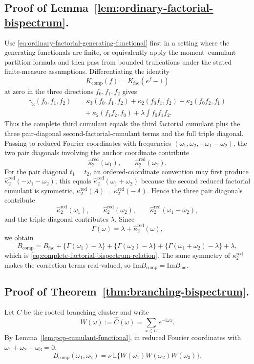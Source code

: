\documentclass[aap,press]{apt} \volno{00} \partno{00}
\newcommand{\E}{\mathbb{E}}
\renewcommand{\ii}{\mathrm{i}}
\newcommand{\1}{\mathbf{1}}
\newcommand{\Imm}{\mathrm{Im}}
\numberwithin{equation}{section}
\begin{document}
\subsection{Proof of Lemma~\ref{lem:ordinary-factorial-bispectrum}.}
Use \eqref{eq:ordinary-factorial-generating-functional} first in a setting where the generating functionals are finite, or equivalently apply the moment--cumulant partition formula and then pass from bounded truncations under the stated finite-measure assumptions. Differentiating the identity
\[
K_{\mathrm{comp}}(f)=K_{\mathrm{fac}}(e^f-1)
\]
at zero in the three directions $f_0,f_1,f_2$ gives
\begin{align*}
\gamma_3(f_0,f_1,f_2)
&=
\kappa_3(f_0,f_1,f_2)
+\kappa_2(f_0f_1,f_2)
+\kappa_2(f_0f_2,f_1) \\
&\quad+\kappa_2(f_1f_2,f_0)
+\lambda\int f_0f_1f_2 .
\end{align*}
Thus the complete third cumulant equals the third factorial cumulant plus the three pair-diagonal second-factorial-cumulant terms and the full triple diagonal. Passing to reduced Fourier coordinates with frequencies $(\omega_1,\omega_2,-\omega_1-\omega_2)$, the two pair diagonals involving the anchor coordinate contribute
\[
\widehat\kappa_2^{\mathrm{red}}(\omega_1),\qquad
\widehat\kappa_2^{\mathrm{red}}(\omega_2).
\]
For the pair diagonal $t_1=t_2$, an ordered-coordinate convention may first produce $\widehat\kappa_2^{\mathrm{red}}(-\omega_1-\omega_2)$; this equals $\widehat\kappa_2^{\mathrm{red}}(\omega_1+\omega_2)$ because the second reduced factorial cumulant is symmetric, $\kappa_2^{\mathrm{red}}(A)=\kappa_2^{\mathrm{red}}(-A)$. Hence the three pair diagonals contribute
\[
\widehat\kappa_2^{\mathrm{red}}(\omega_1),\qquad
\widehat\kappa_2^{\mathrm{red}}(\omega_2),\qquad
\widehat\kappa_2^{\mathrm{red}}(\omega_1+\omega_2),
\]
and the triple diagonal contributes $\lambda$. Since
\[
\Gamma(\omega)=\lambda+\widehat\kappa_2^{\mathrm{red}}(\omega),
\]
we obtain
\[
B_{\mathrm{comp}}
=
B_{\mathrm{fac}}
+\{\Gamma(\omega_1)-\lambda\}
+\{\Gamma(\omega_2)-\lambda\}
+\{\Gamma(\omega_1+\omega_2)-\lambda\}
+\lambda,
\]
which is \eqref{eq:complete-factorial-bispectrum-relation}. The same symmetry of $\kappa_2^{\mathrm{red}}$ makes the correction terms real-valued, so $\Imm B_{\mathrm{comp}}=\Imm B_{\mathrm{fac}}$.

\subsection{Proof of Theorem~\ref{thm:branching-bispectrum}.}
Let $C$ be the rooted branching cluster and write
\[
W(\omega):=\widehat C(\omega)=\sum_{x\in C}e^{-\ii\omega x}.
\]
By Lemma~\ref{lem:pcp-cumulant-functional}, in reduced Fourier coordinates with $\omega_1+\omega_2+\omega_3=0$,
\begin{equation}\label{eq:poisson-cluster-complete-cumulant-moment}
B_{\mathrm{comp}}(\omega_1,\omega_2)=\nu\,\E\{W(\omega_1)W(\omega_2)W(\omega_3)\}.
\end{equation}
\end{document}
